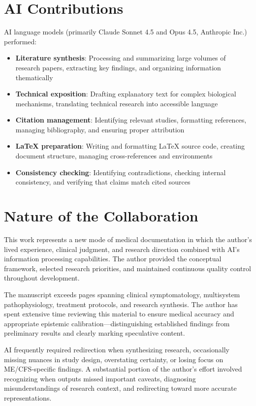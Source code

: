 \section*{AI Contributions}

AI language models (primarily Claude Sonnet 4.5 and Opus 4.5, Anthropic Inc.) performed:

\begin{itemize}
    \item \textbf{Literature synthesis}: Processing and summarizing large volumes of research papers, extracting key findings, and organizing information thematically
    \item \textbf{Technical exposition}: Drafting explanatory text for complex biological mechanisms, translating technical research into accessible language
    \item \textbf{Citation management}: Identifying relevant studies, formatting references, managing bibliography, and ensuring proper attribution
    \item \textbf{LaTeX preparation}: Writing and formatting LaTeX source code, creating document structure, managing cross-references and environments
    \item \textbf{Consistency checking}: Identifying contradictions, checking internal consistency, and verifying that claims match cited sources
\end{itemize}

\section*{Nature of the Collaboration}

This work represents a new mode of medical documentation in which the author's lived experience, clinical judgment, and research direction combined with AI's information processing capabilities. The author provided the conceptual framework, selected research priorities, and maintained continuous quality control throughout development.

The manuscript exceeds \RoundedPageCount{} pages spanning clinical symptomatology, multisystem pathophysiology, treatment protocols, and research synthesis. The author has spent extensive time reviewing this material to ensure medical accuracy and appropriate epistemic calibration---distinguishing established findings from preliminary results and clearly marking speculative content.

AI frequently required redirection when synthesizing research, occasionally missing nuances in study design, overstating certainty, or losing focus on ME/CFS-specific findings. A substantial portion of the author's effort involved recognizing when outputs missed important caveats, diagnosing misunderstandings of research context, and redirecting toward more accurate representations.

